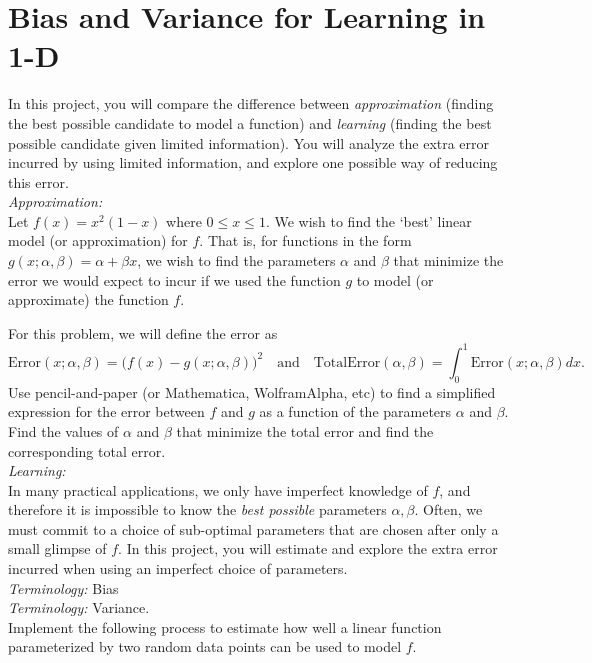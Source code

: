 \section{Bias and Variance for Learning in 1-D}
In this project, you will compare the difference between \textit{approximation} (finding the best possible candidate to model a function) and \textit{learning} (finding the best possible candidate given limited information). You will analyze the extra error incurred by using limited information, and explore one possible way of reducing this error.\\

\noindent\textit{Approximation:}\\
Let $f(x) = x^2(1-x)$ where $0 \leq x \leq 1$. We wish to find the `best' linear model (or approximation) for $f$. That is, for functions in the form $g(x; \alpha, \beta) =  \alpha +  \beta x$,  we wish to find the parameters $ \alpha$ and $ \beta$ that minimize the error we would expect to incur if we used the function $g$ to model (or approximate) the function $f$. 
\begin{center}
\end{center}
For this problem, we will define the error as
\begin{equation*}
\text{Error}(x;\alpha,\beta) = \bigg(f(x) - g(x; \alpha, \beta)\bigg)^2 
\quad \text{and} \quad
\text{TotalError}(\alpha,\beta) = \int_0^1 \text{Error}(x; \alpha,\beta) dx.
\end{equation*} 
Use pencil-and-paper (or Mathematica, WolframAlpha, etc) to find a simplified expression for the error between $f$ and $g$ as a function of the parameters $ \alpha$ and $ \beta$. Find the values of $ \alpha$ and $ \beta$ that minimize the total error and find the corresponding total error.\\

\noindent\textit{Learning:}\\
In many practical applications, we only have imperfect knowledge of $f$, and therefore it is impossible to know the \textit{best possible} parameters $\alpha, \beta$. 
Often, we must commit to a choice of sub-optimal parameters that are chosen after only a small glimpse of $f$. 
In this project, you will estimate and explore the extra error incurred when using an imperfect choice of parameters.\\
\noindent\textit{Terminology:} Bias\\
\noindent\textit{Terminology:} Variance.\\
Implement the following process to estimate how well a linear function parameterized by two random data points can be used to model $f$.\\


